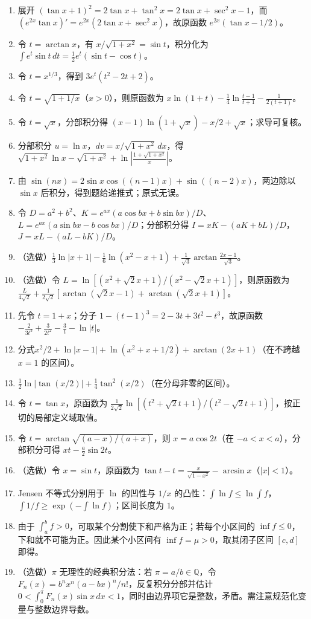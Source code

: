 \begin{enumerate}
\item 展开 $(\tan x+1)^2=2\tan x+\tan^2x=2\tan x+\sec^2x-1$，而 $(e^{2x}\tan x)'=e^{2x}(2\tan x+\sec^2x)$，故原函数 $e^{2x}(\tan x-1/2)$。
\item 令 $t=\arctan x$，有 $x/\sqrt{1+x^2}=\sin t$，积分化为 $\int e^t\sin t\,dt=\frac12e^t(\sin t-\cos t)$。
\item 令 $t=x^{1/3}$，得到 $3e^t(t^2-2t+2)$。
\item 令 $t=\sqrt{1+1/x}$（$x>0$），则原函数为 $x\ln(1+t)-\frac14\ln\frac{t-1}{t+1}-\frac1{2(t+1)}$。
\item 令 $t=\sqrt x$，分部积分得 $(x-1)\ln(1+\sqrt x)-x/2+\sqrt x$；求导可复核。
\item 分部积分 $u=\ln x$，$dv=x/\sqrt{1+x^2}\,dx$，得 $\sqrt{1+x^2}\ln x-\sqrt{1+x^2}+\ln\left|\frac{1+\sqrt{1+x^2}}x\right|$。
\item 由 $\sin(nx)=2\sin x\cos((n-1)x)+\sin((n-2)x)$，两边除以 $\sin x$ 后积分，得到题给递推式；原式无误。
\item 令 $D=a^2+b^2$、$K=e^{ax}(a\cos bx+b\sin bx)/D$、$L=e^{ax}(a\sin bx-b\cos bx)/D$；分部积分得 $I=xK-(aK+bL)/D$，$J=xL-(aL-bK)/D$。
\item（选做）$\frac13\ln|x+1|-\frac16\ln(x^2-x+1)+\frac1{\sqrt3}\arctan\frac{2x-1}{\sqrt3}$。
\item（选做）令 $L=\ln[(x^2+\sqrt2x+1)/(x^2-\sqrt2x+1)]$，则原函数为 $\frac{L}{4\sqrt2}+\frac1{2\sqrt2}[\arctan(\sqrt2x-1)+\arctan(\sqrt2x+1)]$。
\item 先令 $t=1+x$；分子 $1-(t-1)^3=2-3t+3t^2-t^3$，故原函数 $-\frac2{3t^3}+\frac3{2t^2}-\frac3t-\ln|t|$。
\item 分式$x^2/2+\ln|x-1|+\ln(x^2+x+1/2)+\arctan(2x+1)$（在不跨越 $x=1$ 的区间）。
\item $\frac12\ln|\tan(x/2)|+\frac14\tan^2(x/2)$（在分母非零的区间）。
\item 令 $t=\tan x$，原函数为 $\frac1{2\sqrt2}\ln[(t^2+\sqrt2t+1)/(t^2-\sqrt2t+1)]$，按正切的局部定义域取值。
\item 令 $t=\arctan\sqrt{(a-x)/(a+x)}$，则 $x=a\cos2t$（在 $-a<x<a$），分部积分可得 $xt-\frac a2\sin2t$。
\item（选做）令 $x=\sin t$，原函数为 $\tan t-t=\frac{x}{\sqrt{1-x^2}}-\arcsin x$（$|x|<1$）。
\item Jensen 不等式分别用于 $\ln$ 的凹性与 $1/x$ 的凸性：$\int\ln f\le\ln\int f$，$\int 1/f\ge\exp(-\int\ln f)$；区间长度为 $1$。
\item 由于 $\int_a^bf>0$，可取某个分割使下和严格为正；若每个小区间的 $\inf f\le0$，下和就不可能为正。因此某个小区间有 $\inf f=\mu>0$，取其闭子区间 $[c,d]$ 即得。
\item（选做）$\pi$ 无理性的经典积分法：若 $\pi=a/b\in\mathbb Q$，令 $F_n(x)=b^nx^n(a-bx)^n/n!$，反复积分分部并估计 $0<\int_0^\pi F_n(x)\sin x\,dx<1$，同时由边界项它是整数，矛盾。需注意规范化变量与整数边界导数。
\end{enumerate}
